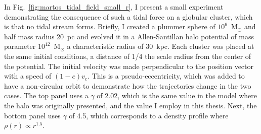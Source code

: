             In Fig.~\ref{fig:martos_tidal_field_small_r}, I present a small experiment demonstrating the consequence of such a tidal force on a globular cluster, which is that no tidal stream forms. Briefly, I created a plummer sphere of $10^6$~M$_\odot$ and half mass radius 20~pc and evolved it in a Allen-Santillan halo potential of mass parameter $10^{12}$~M$_\odot$ a characteristic radius of $30$~kpc. Each cluster was placed at the same initial conditions, a distance of 1/4 the scale radius from the center of the potential. The initial velocity was made perpendicular to the position vector with a speed of $(1-e)v_\textrm{c}$. This is a pseudo-eccentricity, which was added to have a non-circular orbit to demonstrate how the trajectories change in the two cases. The top panel uses a $\gamma$ of 2.02, which is the same value in the model where the halo was originally presented, and the value I employ in this thesis. Next, the bottom panel uses $\gamma$ of 4.5, which corresponds to a density profile where $\rho(r) \propto r^{1.5}$. 


